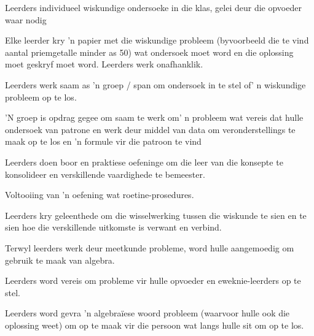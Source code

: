 Leerders individueel wiskundige ondersoeke in die klas, gelei deur die opvoeder waar nodig

Elke leerder kry 'n papier met die wiskundige probleem (byvoorbeeld die te vind aantal priemgetalle minder as 50) wat ondersoek moet word en die oplossing moet geskryf moet word. Leerders werk onafhanklik.

Leerders werk saam as 'n groep / span om ondersoek in te stel of' n wiskundige probleem op te los.

'N groep is opdrag gegee om saam te werk om' n probleem wat vereis dat hulle ondersoek van patrone en werk deur middel van data om veronderstellings te maak op te los en 'n ​​formule vir die patroon te vind

Leerders doen boor en praktiese oefeninge om die leer van die konsepte te konsolideer en verskillende vaardighede te bemeester.

Voltooiing van 'n oefening wat roetine-prosedures.

Leerders kry geleenthede om die wisselwerking tussen die wiskunde te sien en te sien hoe die verskillende uitkomste is verwant en verbind.

Terwyl leerders werk deur meetkunde probleme, word hulle aangemoedig om gebruik te maak van algebra.

Leerders word vereis om probleme vir hulle opvoeder en eweknie-leerders op te stel.

 Leerders word gevra 'n algebraïese woord probleem (waarvoor hulle ook die oplossing weet) om op te maak vir die persoon wat langs hulle sit om op te los.

